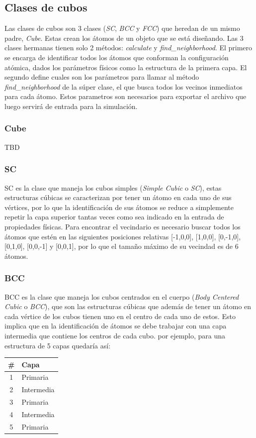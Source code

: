 \subsection{Clases de cubos}


Las clases de cubos son 3 clases (\emph{SC}, \emph{BCC} y \emph{FCC}) que heredan de un mismo padre, \emph{Cube}. Estas crean los átomos de un objeto que se está diseñando. Las 3 clases hermanas tienen solo 2 métodos: \emph{calculate} y \emph{find\_neighborhood}. El primero se encarga de identificar todos los átomos que conforman la configuración atómica, dados los parámetros físicos como la estructura de la primera capa. El segundo define cuales son los parámetros para llamar al método \emph{find\_neighborhood} de la súper clase, el que busca todos los vecinos inmediatos para cada átomo. Estos parametros son necesarios para exportar el archivo que luego servirá de entrada para la simulación.

\subsubsection{Cube}
TBD


\subsubsection{SC}
\label{cubeClasesSC}
SC es la clase que maneja los cubos simples (\emph{Simple Cubic} o \emph{SC}), estas estructuras cúbicas se caracterizan por tener un átomo en cada uno de sus vértices, por lo que la identificación de sus átomos se reduce a simplemente repetir la capa superior tantas veces como sea indicado en la entrada de propiedades físicas. Para encontrar el vecindario es necesario buscar todos los átomos que estén en las siguientes posiciones relativas [-1,0,0], [1,0,0], [0,-1,0], [0,1,0], [0,0,-1] y [0,0,1], por lo que el tamaño máximo de su vecindad es de 6 átomos.

\subsubsection{BCC}
BCC es la clase que maneja los cubos centrados en el cuerpo (\emph{Body Centered Cubic} o \emph{BCC}), que son las estructuras cúbicas que además de tener un átomo en cada vértice de los cubos tienen uno en el centro de cada uno de estos. Esto implica que en la identificación de átomos se debe trabajar con una capa intermedia que contiene los centros de cada cubo. por ejemplo, para una estructura de 5 capas quedaría así:
\begin{center}
  \begin{tabular}{ c | l }
    \# & Capa \\
    \hline
    1 & Primaria \\
    2 & Intermedia \\
    3 & Primaria \\
    4 & Intermedia \\
    5 & Primaria \\
    \hline
  \end{tabular}
\end{center}

